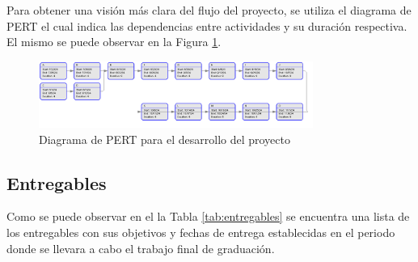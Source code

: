 \documentclass[12pt]{article}
\begin{document}
Para obtener una visión más clara del flujo del proyecto, se utiliza el diagrama de PERT el cual indica las dependencias entre actividades y su duración respectiva. El mismo se puede observar en la Figura \ref{fig:pert}.

\begin{figure}[h!]
  \centering
  \includegraphics[width=0.8\textwidth]{diagramas/pert.png}
  \caption{Diagrama de PERT para el desarrollo del proyecto}
  \label{fig:pert}
\end{figure}

\subsection{Entregables}

Como se puede observar en el la Tabla \ref{tab:entregables} se encuentra una lista de los entregables con sus objetivos y fechas de entrega establecidas en el periodo donde se llevara a cabo el trabajo final de graduación.

\begin{table}[h!]
  \caption{Entregables}
  \label{tab:entregables}
  \end{table}
\end{document}
